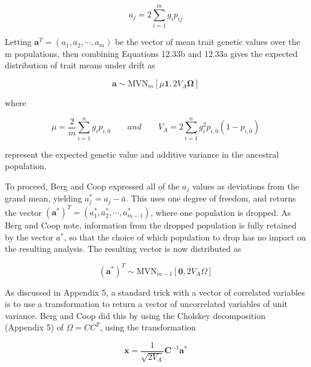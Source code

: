 \documentclass{article}
\begin{document}
\begin{equation}
a_{j}=2\sum_{i=1}^{m}g_{i}p_{ij}
\tag{12.33b}
\label{eq:12_33b}
\end{equation}

Letting  $ \mathbf{a}^{T}=(a_{1},a_{2},\cdots,a_{m}) $ be the vector of mean trait genetic values over the m populations, then combining Equations 12.33b and 12.33a gives the expected distribution of trait means under drift as

\begin{equation}
\mathbf{a}\sim\mathrm{M V N}_{m}\left[\mu\mathbf{1},2V_{A}\boldsymbol{\Omega}\right]
\tag{13.33c}
\label{eq:13_33c}
\end{equation}

where

\begin{equation}
\mu=\frac{2}{m}\sum_{i=1}^{n}g_{i}p_{i,0}\qquad and\qquad V_{A}=2\sum_{i=1}^{n}g_{i}^{2}p_{i,0}(1-p_{i,0})
\tag{13.33d}
\label{eq:13_33d}
\end{equation}

represent the expected genetic value and additive variance in the ancestral population.

To proceed, Berg and Coop expressed all of the  $ a_j $ values as deviations from the grand mean, yielding  $ a_j^* = a_j - \bar{a} $. This uses one degree of freedom, and returns the vector  $ (\mathbf{a}^*)^T = (a_1^*, a_2^*, \cdots, a_{m-1}^*) $, where one population is dropped. As Berg and Coop note, information from the dropped population is fully retained by the vector  $ a^* $, so that the choice of which population to drop has no impact on the resulting analysis. The resulting vector is now distributed as

\begin{equation}
(\mathbf{a}^{*})^{T}\sim\mathrm{M V N}_{m-1}\left[\mathbf{0},2V_{A}\boldsymbol{\varOmega}\right]
\tag{13.33e}
\label{eq:13_33e}
\end{equation}

As discussed in Appendix 5, a standard trick with a vector of correlated variables is to use a transformation to return a vector of uncorrelated variables of unit variance. Berg and Coop did this by using the Cholskey decomposition (Appendix 5) of  $ \Omega = CC^{T} $, using the transformation

\begin{equation}
\mathbf{x}=\frac{1}{\sqrt{2V_{A}}}\mathbf{C}^{-1}\mathbf{a}^{*}
\tag{13.33f}
\label{eq:13_33f}
\end{equation}
\end{document}
